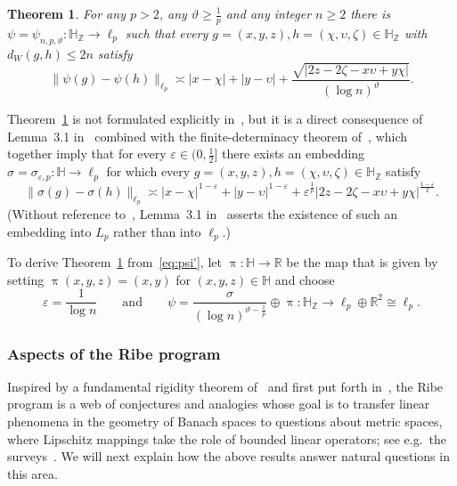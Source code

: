 \documentclass[11pt,reqno]{amsart}
\renewcommand{\H}{\mathbb{H}}
\newcommand{\R}{\mathbb{R}}
\newcommand{\Z}{\mathbb{Z}}
\newcommand{\e}{\varepsilon}
\newcommand{\0}{\mathbf{0}}
\renewcommand{\1}{\mathbf 1}
\newcommand{\from}{\colon}
\renewcommand{\ge}{\geqslant}
\renewcommand{\le}{\leqslant}
\newtheorem{thm}{Theorem}[section]
\theoremstyle{remark}
\begin{document}
\begin{thm}\label{thm:twist the center Lp} For any $p>2$, any $\vartheta\ge \frac{1}{p}$ and any integer $n\ge 2$ there is $\psi=\psi_{n,p,\vartheta}\from\H_\Z\to \ell_p$ such that every $g=(x,y,z),h=(\chi,\upsilon,\zeta)\in \H_\Z$ with $d_W(g,h)\le 2n$ satisfy
\begin{equation}\label{eq:twisted z L4}
\|\psi(g)-\psi(h)\|_{\ell_p}\asymp |x-\chi|+|y-\upsilon|+\frac{\sqrt{|2z-2\zeta-x\upsilon+y\chi|}}{(\log n)^\vartheta}.
\end{equation}

\end{thm}
Theorem~\ref{thm:twist the center Lp} is not formulated explicitly in~\cite{LN14}, but  it is a direct consequence of  Lemma~3.1 in~\cite{LN14} combined with the finite-determinacy theorem of~\cite{Ost12}, which together imply that for every $\e\in (0,\frac12]$ there exists an embedding $\sigma=\sigma_{\e,p}\from\H\to \ell_p$ for which  every $g=(x,y,z),h=(\chi,\upsilon,\zeta)\in \H_\Z$ satisfy
\begin{equation}\label{eq:psi'}
\|\sigma(g)-\sigma(h)\|_{\ell_p}\asymp |x-\chi|^{1-\e}+|y-\upsilon|^{1-\e}+\e^{\frac{1}{p}}|2z-2\zeta-x\upsilon+y\chi|^{\frac{1-\e}{2}}.
\end{equation}
(Without reference to~\cite{Ost12}, Lemma~3.1 in~\cite{LN14} asserts the existence of such an embedding into $L_p$ rather than into $\ell_p$.)

To derive Theorem~\ref{thm:twist the center Lp} from~\eqref{eq:psi'}, let $\uppi\from \H\to \R$ be the map that is given by setting  $\uppi(x,y,z)= (x,y)$ for  $(x,y,z)\in \H$ and choose
\begin{equation}\label{eq:psi parametrs}\e=\frac{1}{\log n}\qquad  \mathrm{and}\qquad  \psi=\frac{\sigma}{(\log n)^{\vartheta-\frac{1}{p}}}\oplus \uppi\from\H_\Z\to \ell_p\oplus \R^2\cong \ell_p.
\end{equation}


\subsubsection{Aspects of the Ribe program}\label{sec:aspects of ribe} Inspired by a fundamental rigidity theorem of~\cite{Rib76} and first put forth in~\cite{Bou86}, the Ribe program is a web of conjectures and analogies whose goal is to transfer linear phenomena in the geometry of Banach spaces to questions about metric spaces, where  Lipschitz mappings take the role of bounded linear operators; see e.g.~the surveys~\cite{Kal08-survey,Nao12,Bal13,Ost13,Nao18}. We will next explain how the above results answer natural questions in this area.
\end{document}
